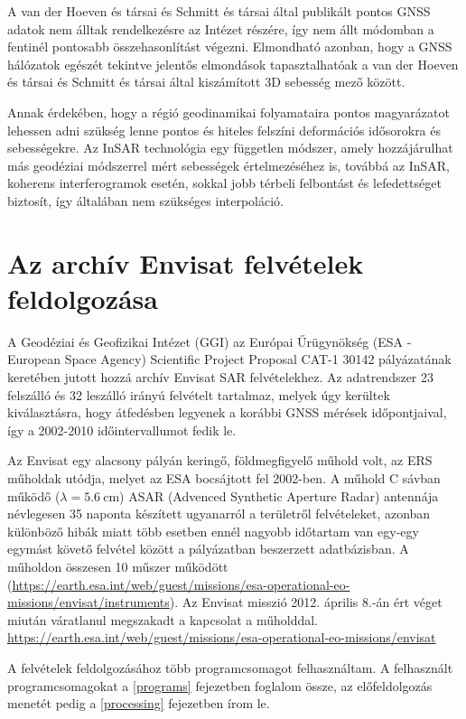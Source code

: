 \documentclass[12pt]{report}
\numberwithin{equation}{section}
\numberwithin{table}{section}
\numberwithin{figure}{section}
\begin{document}
A van der Hoeven és társai és Schmitt és társai \cite{Hoeven2005, Schmitt2007} által publikált pontos GNSS adatok nem álltak rendelkezésre az Intézet részére, így nem állt módomban a fentinél pontosabb összehasonlítást végezni. Elmondható azonban, hogy a GNSS hálózatok egészét tekintve jelentős elmondások tapasztalhatóak a van der Hoeven és társai és Schmitt és társai \cite{Hoeven2005, Schmitt2007} által kiszámított 3D sebesség mező között.

Annak érdekében, hogy a régió geodinamikai folyamataira pontos magyarázatot lehessen adni szükség lenne pontos és hiteles felszíni deformációs idősorokra és sebességekre. Az InSAR technológia egy független módszer, amely hozzájárulhat más geodéziai módszerrel mért sebességek értelmezéséhez is, továbbá az InSAR, koherens interferogramok esetén, sokkal jobb térbeli felbontást és lefedettséget biztosít, így általában nem szükséges interpoláció.

\chapter{Az archív Envisat felvételek feldolgozása}

A Geodéziai és Geofizikai Intézet (GGI) az Európai Űrügynökség (ESA - European Space Agency) Scientific Project Proposal CAT-1 30142 pályázatának keretében jutott hozzá archív Envisat SAR felvételekhez. Az adatrendszer 23 felszálló és 32 leszálló irányú felvételt tartalmaz, melyek úgy kerültek kiválasztásra, hogy átfedésben legyenek a korábbi GNSS mérések időpontjaival, így a 2002-2010 időintervallumot fedik le.

Az Envisat egy alacsony pályán keringő, földmegfigyelő műhold volt, az ERS műholdak utódja, melyet az ESA bocsájtott fel 2002-ben.  A műhold C sávban működő ($\lambda = \SI{5.6}{\centi\meter}$) ASAR (Advenced Synthetic Aperture Radar) antennája névlegesen 35 naponta készített ugyanarról a területről felvételeket, azonban különböző hibák miatt több esetben ennél nagyobb  időtartam van egy-egy egymást követő felvétel között a pályázatban beszerzett adatbázisban. A műholdon összesen 10 műszer működött (\url{https://earth.esa.int/web/guest/missions/esa-operational-eo-missions/envisat/instruments}). Az Envisat misszió 2012. április 8.-án ért véget miután váratlanul megszakadt a kapcsolat a műholddal. \url{https://earth.esa.int/web/guest/missions/esa-operational-eo-missions/envisat}

A felvételek feldolgozásához több programcsomagot felhasználtam. A felhasznált programcsomagokat a \ref{programs} fejezetben foglalom össze, az előfeldolgozás menetét pedig a \ref{processing} fejezetben írom le.
\end{document}
